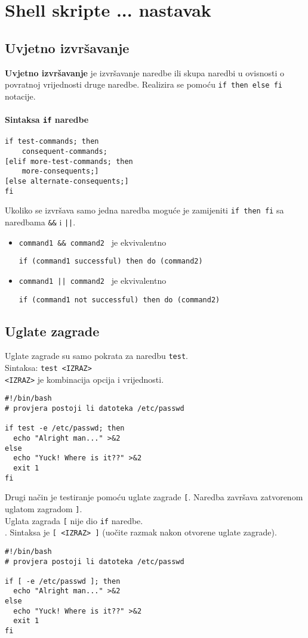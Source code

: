 \section{Shell skripte ... nastavak}

\subsection*{Uvjetno izvršavanje}
\textbf{Uvjetno izvršavanje} je izvršavanje naredbe ili skupa naredbi u ovisnosti o povratnoj vrijednosti druge naredbe. Realizira se pomoću \texttt{if then else fi} notacije.

\paragraph{Sintaksa \texttt{if} naredbe}
\begin{lstlisting}
if test-commands; then
    consequent-commands;
[elif more-test-commands; then
    more-consequents;]
[else alternate-consequents;]
fi
\end{lstlisting}

Ukoliko se izvršava samo jedna naredba moguće je zamijeniti \texttt{if then fi} sa naredbama \texttt{\&\&} i \texttt{||}.
\begin{itemize}
 \item 
\lstinline!command1 && command2 ! je ekvivalentno 

\lstinline!if (command1 successful) then do (command2)!

\item \lstinline!command1 || command2 ! je ekvivalentno 

\lstinline!if (command1 not successful) then do (command2)!

\end{itemize}


\subsection*{Uglate zagrade}
Uglate zagrade su samo pokrata za naredbu \texttt{test}. 
\\
Sintaksa: \texttt{test <IZRAZ>}
\\
\texttt{<IZRAZ>} je kombinacija opcija i vrijednosti.
\begin{lstlisting}
#!/bin/bash
# provjera postoji li datoteka /etc/passwd

if test -e /etc/passwd; then
  echo "Alright man..." >&2
else
  echo "Yuck! Where is it??" >&2
  exit 1
fi
\end{lstlisting}
Drugi način je testiranje pomoću uglate zagrade \texttt{[}. Naredba završava zatvorenom uglatom zagradom \texttt{]}. \\
Uglata zagrada \texttt{[} nije dio \texttt{if} naredbe.\\.
Sintaksa je \texttt{[ <IZRAZ> ]} (uočite razmak nakon otvorene uglate zagrade).
\begin{lstlisting}
#!/bin/bash
# provjera postoji li datoteka /etc/passwd

if [ -e /etc/passwd ]; then
  echo "Alright man..." >&2
else
  echo "Yuck! Where is it??" >&2
  exit 1
fi
\end{lstlisting}


